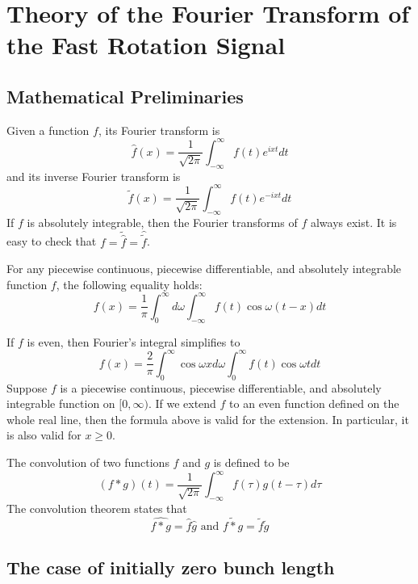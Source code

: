 \newpage
\section{Theory of the Fourier Transform of the Fast Rotation Signal}

\subsection{Mathematical Preliminaries}

\begin{definition}
Given a function $f$, its Fourier transform is \[\hat{f}(x)=\frac{1}{\sqrt{2\pi}}\int^{\infty}_{-\infty}f(t)e^{ixt}dt\] and its inverse Fourier transform is \[\tilde{f}(x)=\frac{1}{\sqrt{2\pi}}\int^{\infty}_{-\infty}f(t)e^{-ixt}dt\] If $f$ is absolutely integrable, then the Fourier transforms of $f$ always exist. It is easy to check that $f=\tilde{\hat{f}}=\hat{\tilde{f}}$.
\end{definition}

\begin{theorem}
For any piecewise continuous, piecewise differentiable, and absolutely integrable function $f$, the following equality holds: \[f(x)=\frac{1}{\pi}\int^{\infty}_0d\omega\int^{\infty}_{-\infty}f(t)\cos\omega(t-x)dt\]
\end{theorem}

If $f$ is even, then Fourier's integral simplifies to \[f(x)=\frac{2}{\pi}\int^{\infty}_0\cos\omega xd\omega\int^{\infty}_0f(t)\cos\omega tdt\]Suppose $f$ is a piecewise continuous, piecewise differentiable, and absolutely integrable function on $[0,\infty)$. If we extend $f$ to an even function defined on the whole real line, then the formula above is valid for the extension. In particular, it is also valid for $x\geq 0$.

\begin{theorem}
The convolution of two functions $f$ and $g$ is defined to be \[(f\ast g)(t)=\frac{1}{\sqrt{2\pi}}\int^{\infty}_{-\infty}f(\tau)g(t-\tau)d\tau\] The convolution theorem states that \[\widehat{f\ast g}=\hat{f}\hat{g} \text{ and } \widetilde{f\ast g}=\tilde{f}\tilde{g}\] 
\end{theorem}

\subsection{The case of initially zero bunch length}

